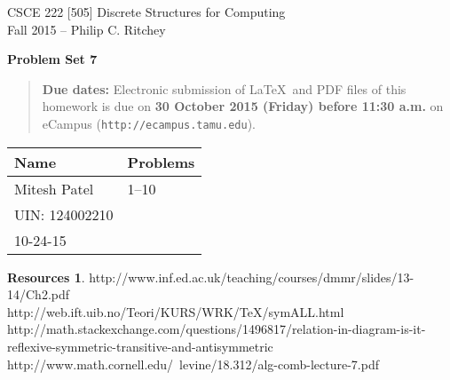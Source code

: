 \documentclass{article}
\theoremstyle{definition}
\newtheorem*{resources}{Resources}
\newcommand{\names}[5]{
\begin{center}
\begin{tabular}{|ll|}
\hline
\textbf{Name}  & \textbf{Problems}\\
\hline
#1 & 1--10\\
#2 & #3\\
#4 & #5\\
\hline
\end{tabular}
\end{center}
}
\newcommand{\problemset}[1]{\begin{center}\textbf{Problem Set #1}\end{center}}
\newcommand{\duedate}[1]{\begin{quote}\textbf{Due dates:} Electronic
    submission of \LaTeX\ and PDF files of this homework is due on
    \textbf{#1} on eCampus (\texttt{http://ecampus.tamu.edu}). 
    \end{quote}}
\begin{document}
\begin{center}
{\large
CSCE 222 [505] Discrete Structures for Computing\\[.5ex]
Fall 2015 -- Philip C. Ritchey\\}
\end{center}

\problemset{7}

\duedate{30 October 2015 (Friday) before 11:30 a.m.}

\names{Mitesh Patel}
{UIN: 124002210}{}
{10-24-15}{}

\begin{resources} 
http://www.inf.ed.ac.uk/teaching/courses/dmmr/slides/13-14/Ch2.pdf\\
http://web.ift.uib.no/Teori/KURS/WRK/TeX/symALL.html\\
http://math.stackexchange.com/questions/1496817/relation-in-diagram-is-it-reflexive-symmetric-transitive-and-antisymmetric\\
http://www.math.cornell.edu/~levine/18.312/alg-comb-lecture-7.pdf

\end{resources}

\bigskip
\end{document}
